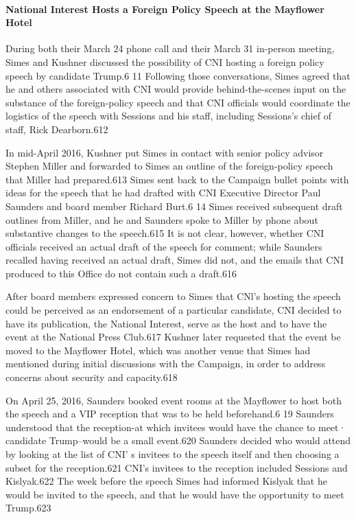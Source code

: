 \paragraph{National Interest Hosts a Foreign Policy Speech at the Mayflower Hotel}

During both their March 24 phone call and their March 31 in-person meeting, Simes and Kushner discussed the possibility of CNI hosting a foreign policy speech by candidate Trump.6 11 Following those conversations, Simes agreed that he and others associated with CNI would provide behind-the-scenes input on the substance of the foreign-policy speech and that CNI officials would coordinate the logistics of the speech with Sessions and his staff, including Sessions's chief of staff, Rick Dearborn.612

In mid-April 2016, Kushner put Simes in contact with senior policy advisor Stephen Miller and forwarded to Simes an outline of the foreign-policy speech that Miller had prepared.613 Simes sent back to the Campaign bullet points with ideas for the speech that he had drafted with CNI Executive Director Paul Saunders and board member Richard Burt.6 14 Simes received subsequent draft outlines from Miller,  and he and Saunders spoke to Miller by  phone about substantive changes to the speech.615 It  is not clear, however, whether CNI officials received an actual draft of the speech for comment; while Saunders recalled having received an actual draft, Simes did not, and the emails that CNI produced to this Office do not contain such a draft.616

After board members expressed concern to Simes that CNl's hosting the speech could be perceived as an endorsement of a particular candidate, CNI decided to have its publication, the National Interest, serve as the host and to have the event at the National Press Club.617 Kushner later requested that the event be moved to the Mayflower Hotel, which was another venue that Simes had mentioned during initial discussions with the Campaign, in order to address concerns about security and capacity.618

On April 25, 2016, Saunders booked event rooms at the Mayflower to host both the speech and a VIP reception that was to be held beforehand.6 19 Saunders understood that the reception-at which invitees would have the chance to meet· candidate Trump--would be a  small event.620 Saunders decided who would attend by looking at the list of CNI' s invitees to the speech itself and then choosing a  subset for the reception.621 CNI's invitees to the reception included Sessions and Kislyak.622 The week before the speech Simes had informed Kislyak that he would be invited to the speech, and that he would have the opportunity to meet Trump.623

